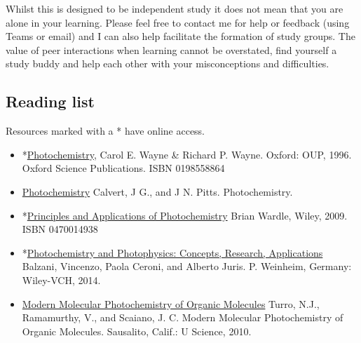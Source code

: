 \documentclass[
]{book}
\begin{document}
Whilst this is designed to be independent study it does not mean that you are alone in your learning. Please feel free to contact me for help or feedback (using Teams or email) and I can also help facilitate the formation of study groups. The value of peer interactions when learning cannot be overstated, find yourself a study buddy and help each other with your misconceptions and difficulties.

\hypertarget{reading-list}{%
\subsection*{Reading list}\label{reading-list}}

Resources marked with a * have online access.

\begin{itemize}
\item
  *\href{https://bibliu.com/app/\#/view/books/9780198558866/epub/html/toc.html}{Photochemistry}, Carol E. Wayne \& Richard P. Wayne. Oxford: OUP, 1996. Oxford Science Publications. ISBN 0198558864
\item
  \href{https://bath-ac-primo.hosted.exlibrisgroup.com/primo-explore/fulldisplay?docid=44BAT_ALMA_DS2131580390002761\&context=L\&vid=44BAT_VU1\&lang=en_US\&search_scope=CSCOP_44BAT_DEEP\&adaptor=Local\%20Search\%20Engine\&tab=local\&query=any,contains,photochemistry\&sortby=rank\&facet=rtype,include,books\&offset=0\&pcAvailability=false}{Photochemistry} Calvert, J G., and J N. Pitts. Photochemistry.
\item
  *\href{https://ebookcentral.proquest.com/lib/bath/detail.action?docID=470772\&pq-origsite=primo}{Principles and Applications of Photochemistry} Brian Wardle, Wiley, 2009. ISBN 0470014938
\item
  *\href{https://ebookcentral.proquest.com/lib/bath/detail.action?pq-origsite=primo\&docID=1662200}{Photochemistry and Photophysics: Concepts, Research, Applications} Balzani, Vincenzo, Paola Ceroni, and Alberto Juris. P. Weinheim, Germany: Wiley-VCH, 2014.
\item
  \href{https://bath-ac-primo.hosted.exlibrisgroup.com/primo-explore/fulldisplay?docid=44BAT_ALMA_DS2129513080002761\&context=L\&vid=44BAT_VU1\&lang=en_US\&search_scope=CSCOP_44BAT_DEEP\&adaptor=Local\%20Search\%20Engine\&tab=local\&query=any,contains,\%22modern\%20molecular\%20photochemistry\%22\%20turro\&offset=0\&pcAvailability=false}{Modern Molecular Photochemistry of Organic Molecules} Turro, N.J., Ramamurthy, V., and Scaiano, J. C. Modern Molecular Photochemistry of Organic Molecules. Sausalito, Calif.: U Science, 2010.

\end{itemize}
\end{document}
